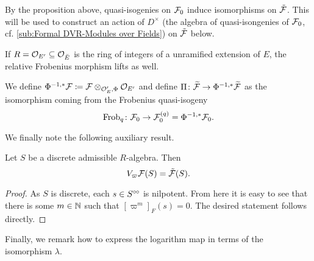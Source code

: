 \documentclass[../main.tex]{subfiles}
\begin{document}
By the proposition above, quasi-isogenies on $\mathcal{F}_0$ induce isomorphisms on 
$\tilde {\mathcal{F}}$. This will be used to construct an action of $D^\times$ 
(the algebra of quasi-isongenies of $\mathcal{F}_0$, cf. \cref{sub:Formal DVR-Modules
over Fields}) on $\tilde {\mathcal{F}}$ below. 

If $R = \mathcal{O}_{E'} \subseteq \mathcal{O}_{{\breve {E}}}$ is the ring of integers of a unramified
extension of $E$, the relative Frobenius morphism lifts as well.
\begin{defi} \label{def:FrobOnUnivCov}
  We define $\Phi^{-1, *}\mathcal{F} \coloneqq \mathcal{F} \otimes_{\mathcal{O}_E', \Phi} \mathcal{O}_{E'}$ and
  define $\Pi\colon \widetilde{\mathcal{F}} \to \Phi^{-1,*}\widetilde{\mathcal{F}}$ as the isomorphism
  coming from the Frobenius quasi-isogeny 
  \begin{equation*}
    \mathrm{Frob}_q\colon \mathcal{F}_0 \to \mathcal{F}_0^{(q)} = \Phi^{-1,*} \mathcal{F}_0.
  \end{equation*}
\end{defi}

We finally note the following auxiliary result.
\begin{lem}\label{lem:UnivCoverIsRatTateifDiscrete}
  Let $S$ be a discrete admissible $R$-algebra. Then
  \begin{equation*}
    V_\varpi \mathcal{F}(S) = \tilde {\mathcal{F}}(S).
  \end{equation*}
\begin{proof}
  As $S$ is discrete, each $s \in S^{\circ \hspace{-0.5pt} \circ}$ is nilpotent. From here it is easy to 
  see that there is some $m \in \mathbb{N}$ such that $[\varpi^m]_F(s) = 0$. The desired 
  statement follows directly.
\end{proof}
\end{lem}

Finally, we remark how to express the logarithm map in terms of the isomorphism
$\lambda$.
\end{document}
